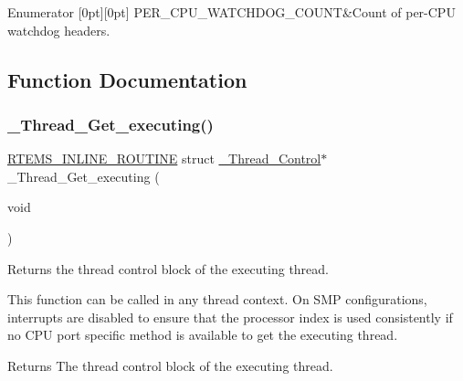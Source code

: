 \begin{DoxyEnumFields}{Enumerator}
[0pt][0pt]{}\mbox{\label{group__PerCPU_gga43ab5440a69211901b58fa787f9cd76ea49ebdf20f41288627c23ddc6e63a20ab}} 
P\+E\+R\+\_\+\+C\+P\+U\+\_\+\+W\+A\+T\+C\+H\+D\+O\+G\+\_\+\+C\+O\+U\+NT&Count of per-\/\+C\+PU watchdog headers. \\
\hline

\end{DoxyEnumFields}


\subsection{Function Documentation}
\mbox{\label{group__PerCPU_ga294cfaf3cf50de03f1d9821d68b9c1bd}} 
\subsubsection{\texorpdfstring{\_Thread\_Get\_executing()}{\_Thread\_Get\_executing()}}
{\footnotesize\ttfamily \mbox{\hyperlink{group__RTEMSScoreBaseDefs_gac216239df231d5dbd15e3520b0b9313f}{R\+T\+E\+M\+S\+\_\+\+I\+N\+L\+I\+N\+E\+\_\+\+R\+O\+U\+T\+I\+NE}} struct \mbox{\hyperlink{struct__Thread__Control}{\+\_\+\+Thread\+\_\+\+Control}}$\ast$ \+\_\+\+Thread\+\_\+\+Get\+\_\+executing (\begin{DoxyParamCaption}\item[{void}]{ }\end{DoxyParamCaption})}



Returns the thread control block of the executing thread. 

This function can be called in any thread context. On S\+MP configurations, interrupts are disabled to ensure that the processor index is used consistently if no C\+PU port specific method is available to get the executing thread.

\begin{DoxyReturn}{Returns}
The thread control block of the executing thread. 
\end{DoxyReturn}


